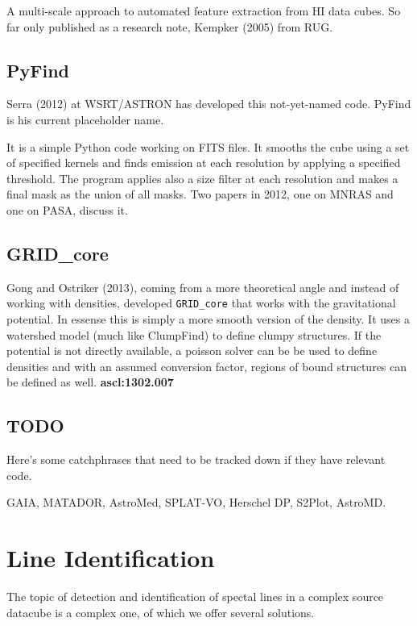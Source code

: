 \documentclass[preprint]{aastex} %
\begin{document}
A multi-scale approach to automated feature extraction from HI
data cubes. 
So far only published as a research note, Kempker (2005) from RUG.


\subsection{PyFind}

Serra (2012) at WSRT/ASTRON
has developed this not-yet-named code. PyFind is his current 
placeholder name. 

It is a simple Python code working on FITS files. It smooths
the cube using a set of specified kernels and finds emission at each
resolution by applying a specified threshold. The program applies also
a size filter at each resolution and makes a final mask as the union
of all masks. Two papers in 2012, one on MNRAS and one on PASA, discuss
it.

\subsection{GRID\_core}

Gong and Ostriker (2013),
coming from a more theoretical angle and 
instead of working with densities, developed 
{\tt GRID\_core} that works with
the gravitational potential.
In essense this is simply a more smooth version of
the density. It uses a watershed model (much like ClumpFind)
to define clumpy structures.  If the potential is not directly
available, a poisson solver can be be used to define densities
and with an assumed conversion factor, regions of bound structures
can be defined as well.  {\bf ascl:1302.007}


\subsection{TODO}

Here's some catchphrases that need to be tracked down if they have
relevant code.

GAIA, MATADOR, AstroMed, SPLAT-VO, Herschel DP, S2Plot, AstroMD. 

\section{Line Identification}


The topic of detection and identification of spectal
lines in a complex source datacube is a complex one,
of which we offer several solutions. 
\end{document}
